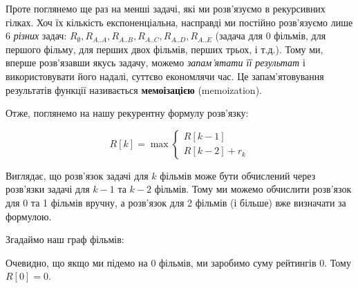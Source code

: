 \documentclass[12pt,a4paper]{report}
\begin{document}
Проте поглянемо ще раз на менші задачі, які ми розв’язуємо в рекурсивних гілках. Хоч їх кількість експоненціальна, насправді ми постійно розв’язуємо лише 6 \emph{різних} задач: \(R_{\emptyset}, R_{A..A}, R_{A..B}, R_{A..C}, R_{A..D}, R_{A..E}\) (задача для 0 фільмів, для першого фільму, для перших двох фільмів, перших трьох, і т.д.). Тому ми, вперше розв’язавши якусь задачу, можемо \emph{запам’ятати її результат} і використовувати його надалі, суттєво економлячи час. Це запам’ятовування результатів функції називається \textbf{мемоізацією} (memoization).

Отже, поглянемо на нашу рекурентну формулу розв’язку:

\begin{equation*}
    R[k] = \max
    \begin{cases}
        R[k - 1] \\
        R[k - 2] + r_k
    \end{cases}
\end{equation*}

Виглядає, що розв’язок задачі для \(k\) фільмів може бути обчислений через розв’язки задачі для \(k - 1\) та \(k - 2\) фільмів. Тому ми можемо обчислити розв’язок для 0 та 1 фільмів вручну, а розв’язок для 2 фільмів (і більше) вже визначати за формулою.

Згадаймо наш граф фільмів:

\begin{center}
\end{center}

Очевидно, що якщо ми підемо на 0 фільмів, ми заробимо суму рейтингів 0. Тому \(R[0] = 0\).
\end{document}
